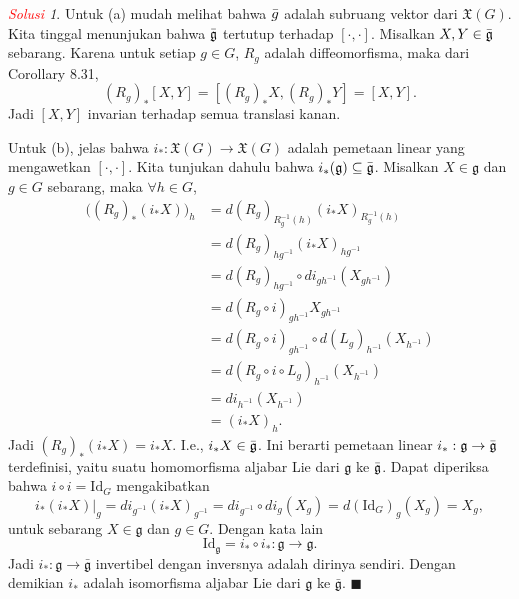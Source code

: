 \documentclass[11pt]{article}
\theoremstyle{definition}
\theoremstyle{remark}
\newtheorem*{solution}{\textcolor{red}{Solusi}}
\newcommand{\Id}{\text{Id}}                 %
\newcommand{\vectfield}{\mathfrak{X}}       %
\begin{document}
\begin{solution}
Untuk (a) mudah melihat bahwa $\Bar{g}$ adalah subruang vektor dari $\vectfield(G)$. Kita tinggal menunjukan bahwa $\Bar{\mathfrak{g}}$ tertutup terhadap $[\cdot,\cdot]$. Misalkan $X,Y \in \Bar{\mathfrak{g}}$ sebarang. Karena untuk setiap $g \in G$, $R_g$ adalah diffeomorfisma, maka dari Corollary 8.31, 
$$
(R_g)_*[X,Y] = [(R_g)_*X, (R_g)_*Y] = [X,Y].
$$
Jadi $[X,Y]$ invarian terhadap semua translasi kanan. 

Untuk (b), jelas bahwa $i_* : \vectfield(G) \to \vectfield(G)$ adalah pemetaan linear yang mengawetkan $[\cdot,\cdot]$. Kita tunjukan dahulu bahwa $i_*(\mathfrak{g}) \subseteq \Bar{\mathfrak{g}}$. Misalkan $X \in \mathfrak{g}$ dan $g \in G$ sebarang, maka $\forall h \in G$,
\begin{align*}
    \big((R_g)_*(i_*X)\big)_{h} &= d(R_g)_{R_g^{-1}(h)} (i_*X)_{R_g^{-1}(h)}  \\
    &= d(R_g)_{hg^{-1}} (i_*X)_{hg^{-1}} \\
    &= d(R_g)_{hg^{-1}} \circ di_{gh^{-1}} (X_{gh^{-1}})\\
    &= d(R_g \circ i)_{gh^{-1}} X_{gh^{-1}} \\
    &= d(R_g \circ i)_{gh^{-1}} \circ d(L_g)_{h^{-1}} (X_{h^{-1}}) \\
    &= d(R_g \circ i \circ L_g)_{h^{-1}}(X_{h^{-1}}) \\
    &= di_{h^{-1}}(X_{h^{-1}}) \\
    &= (i_*X)_{h}.
\end{align*}
Jadi $(R_g)_* (i_*X) = i_*X$. I.e., $i_*X \in \Bar{\mathfrak{g}}$. Ini berarti pemetaan linear $i_* : \mathfrak{g} \to \Bar{\mathfrak{g}}$ terdefinisi, yaitu suatu homomorfisma aljabar Lie dari $\mathfrak{g}$ ke $\Bar{\mathfrak{g}}$. Dapat diperiksa bahwa $i \circ i = \text{Id}_G$ mengakibatkan 
$$
i_*(i_*X)|_g = di_{g^{-1}} (i_*X)_{g^{-1}} = di_{g^{-1}} \circ di_g (X_g) = d(\Id_G)_g(X_g) = X_g,
$$
untuk sebarang $X \in \mathfrak{g}$ dan $g \in G$. Dengan kata lain
$$
\Id_{\mathfrak{g}}  =  i_* \circ i_* : \mathfrak{g} \to \mathfrak{g}.
$$
Jadi $i_* : \mathfrak{g} \to \bar{\mathfrak{g}}$ invertibel dengan inversnya adalah dirinya sendiri. Dengan demikian $i_*$ adalah isomorfisma aljabar Lie dari $\mathfrak{g}$ ke $\bar{\mathfrak{g}}$. $\blacksquare$
\end{solution}
\end{document}
